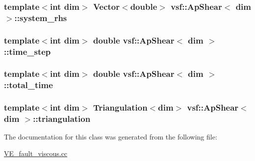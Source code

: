 \hypertarget{classvsf_1_1ApShear_ab1046cf38cb6535dd0ab78793bccf6a1}{
\subsubsection[{system\-\_\-rhs}]{\setlength{\rightskip}{0pt plus 5cm}template$<$int dim$>$ Vector$<$double$>$ {\bf vsf\-::\-Ap\-Shear}$<$ dim $>$\-::system\-\_\-rhs\hspace{0.3cm}{\ttfamily [private]}}}\label{classvsf_1_1ApShear_ab1046cf38cb6535dd0ab78793bccf6a1}
\hypertarget{classvsf_1_1ApShear_ab11c93d8c80fc10976c8fb91a733cf92}{
\subsubsection[{time\-\_\-step}]{\setlength{\rightskip}{0pt plus 5cm}template$<$int dim$>$ double {\bf vsf\-::\-Ap\-Shear}$<$ dim $>$\-::time\-\_\-step\hspace{0.3cm}{\ttfamily [private]}}}\label{classvsf_1_1ApShear_ab11c93d8c80fc10976c8fb91a733cf92}
\hypertarget{classvsf_1_1ApShear_ab4bd5313e37b8819910d35aaae0a2373}{
\subsubsection[{total\-\_\-time}]{\setlength{\rightskip}{0pt plus 5cm}template$<$int dim$>$ double {\bf vsf\-::\-Ap\-Shear}$<$ dim $>$\-::total\-\_\-time\hspace{0.3cm}{\ttfamily [private]}}}\label{classvsf_1_1ApShear_ab4bd5313e37b8819910d35aaae0a2373}
\hypertarget{classvsf_1_1ApShear_a53d0e9d3fdabcac44cc7c6408ace451b}{
\subsubsection[{triangulation}]{\setlength{\rightskip}{0pt plus 5cm}template$<$int dim$>$ Triangulation$<$dim$>$ {\bf vsf\-::\-Ap\-Shear}$<$ dim $>$\-::triangulation\hspace{0.3cm}{\ttfamily [private]}}}\label{classvsf_1_1ApShear_a53d0e9d3fdabcac44cc7c6408ace451b}


The documentation for this class was generated from the following file\-:\begin{DoxyCompactItemize}
\item 
\hyperlink{VE__fault__viscous_8cc}{V\-E\-\_\-fault\-\_\-viscous.\-cc}\end{DoxyCompactItemize}
